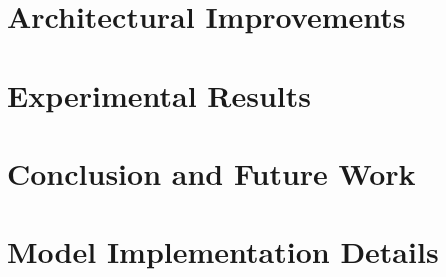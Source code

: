 \documentclass[12pt,a4paper,twoside,openright]{memoir}
\theoremstyle{definition}
\begin{document}
\chapter{Architectural Improvements}
\label{chap:arim}

\chapter{Experimental Results }
\label{chap:expres}

\chapter{Conclusion and Future Work}
\label{chap:conc}

\appendix
\chapter{Model Implementation Details}
\label{chap:imp_details}

\cleardoublepage
\backmatter
\printbibliography
\end{document}
